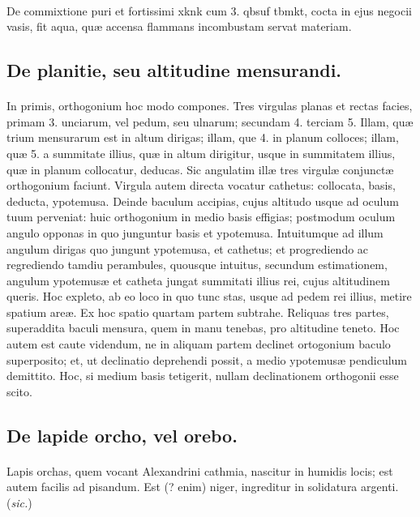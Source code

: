 \documentclass[a4paper, 11pt, oneside, polutonikogreek, italian]{article}
\begin{document}
\paragraph{}
De commixtione puri et fortissimi xknk cum 3. qbsuf tbmkt, cocta in ejus negocii vasis, fit aqua, quæ accensa flammans incombustam servat materiam.

\subsection{De planitie, seu altitudine mensurandi.}
\paragraph{}
In primis, orthogonium hoc modo compones. Tres virgulas planas et rectas facies, primam 3. unciarum, vel pedum, seu ulnarum; secundam 4. terciam 5. Illam, quæ trium mensurarum est in altum dirigas; illam, que 4. in planum colloces; illam, quæ 5. a summitate illius, quæ in altum dirigitur, usque in summitatem illius, quæ in planum collocatur, deducas. Sic angulatim illæ tres virgulæ conjunctæ orthogonium faciunt. Virgula autem directa vocatur cathetus: collocata, basis, deducta, ypotemusa. Deinde baculum accipias, cujus altitudo usque ad oculum tuum perveniat: huic orthogonium in medio basis effigias; postmodum oculum angulo opponas in quo junguntur basis et ypotemusa. Intuitumque ad illum angulum dirigas quo jungunt ypotemusa, et cathetus; et progrediendo ac regrediendo tamdiu perambules, quousque intuitus, secundum estimationem, angulum ypotemusæ et catheta jungat summitati illius rei, cujus altitudinem queris. Hoc expleto, ab eo loco in quo tunc stas, usque ad pedem rei illius, metire spatium areæ. Ex hoc spatio quartam partem subtrahe. Reliquas tres partes, superaddita baculi mensura, quem in manu tenebas, pro altitudine teneto. Hoc autem est caute videndum, ne in aliquam partem declinet ortogonium baculo superposito; et, ut declinatio deprehendi possit, a medio ypotemusæ pendiculum demittito. Hoc, si medium basis tetigerit, nullam declinationem orthogonii esse scito.

\subsection{De lapide orcho, vel orebo.}
\paragraph{}
Lapis orchas, quem vocant Alexandrini cathmia, nascitur in humidis locis; est autem facilis ad pisandum. Est (? enim) niger, ingreditur in solidatura argenti. (\emph{sic.})
\end{document}
